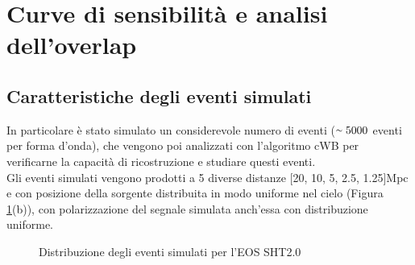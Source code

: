 \section{Curve di sensibilità e analisi dell'overlap}
\label{section:overlap}
\subsection{Caratteristiche degli eventi simulati}
\label{subsection:cwb_injections}
In particolare è stato simulato un considerevole numero di eventi ($\smallsim 5000$ eventi per forma d'onda), che vengono poi analizzati con l'algoritmo cWB per verificarne la capacità di ricostruzione e studiare questi eventi.\\
Gli eventi simulati vengono prodotti a 5 diverse distanze [20, 10, 5, 2.5, 1.25]Mpc e con posizione della sorgente distribuita in modo uniforme nel cielo (Figura \ref{fig:skypos}(b)), con polarizzazione del segnale simulata anch'essa con distribuzione uniforme.
\begin{figure}[ht]
	\vspace{-20pt}
	\centering
	\quad
	\vspace{-5pt}
	\caption{Distribuzione degli eventi simulati per l'EOS SHT2.0}
	\label{fig:skypos}
	\vspace{-10pt}
\end{figure}
